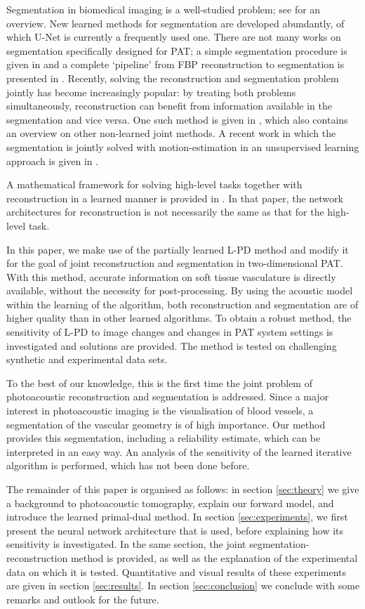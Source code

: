 \documentclass[journal]{IEEEtran}
\newcommand{\hl}[1]{\cbcolor{red}\begin{changebar}{\color{red} #1}\end{changebar}}
\begin{document}
Segmentation in biomedical imaging is a well-studied problem; see \cite{Acton2009} for an overview. New learned methods for segmentation are developed abundantly, of which U-Net \cite{Ronneberger2015} is currently a frequently used one. There are not many works on segmentation specifically designed for PAT; a simple segmentation procedure is given in \cite{Soetikno2012} and a complete `pipeline' from FBP reconstruction to segmentation is presented in \cite{Raumonen2018}. Recently, solving the reconstruction and segmentation problem jointly has become increasingly popular: by treating both problems simultaneously, reconstruction can benefit from information available in the segmentation and vice versa. One such method is given in \cite{Corona2018}, which also contains an overview on other non-learned joint methods. A recent work in which the segmentation is jointly solved with motion-estimation in an unsupervised learning approach is given in \cite{Qin2018}. \hl{A mathematical framework for solving high-level tasks together with reconstruction in a learned manner is provided in \cite{Adler2018b}. In that paper, the network architectures for reconstruction is not necessarily the same as that for the high-level task. }

In this paper, we make use of the partially learned L-PD method and modify it for the goal of joint reconstruction and segmentation in {two-dimensional} PAT. With this method, accurate information on soft tissue vasculature is directly available, without the necessity for post-processing. By using the acoustic model within the learning of the algorithm, both reconstruction and segmentation are of higher quality than in other learned algorithms. To obtain a robust method, the sensitivity of L-PD to image changes and changes in PAT system settings is investigated and solutions are provided. The method is tested on challenging synthetic and experimental data sets. 

To the best of our knowledge, this is the first time the joint problem of photoacoustic reconstruction and segmentation is addressed. Since a major interest in photoacoustic imaging is the visualisation of blood vessels, a segmentation of the vascular geometry is of high importance. Our method provides this segmentation, including a reliability estimate, which can be interpreted in an easy way. An analysis of the sensitivity of the learned iterative algorithm is performed, which has not been done before.

The remainder of this paper is organised as follows: in section \ref{sec:theory} we give a background to photoacoustic tomography, explain our forward model, and introduce the learned primal-dual method. In section \ref{sec:experiments}, we first present the neural network architecture that is used, before explaining how its sensitivity is investigated. In the same section, the joint segmentation-reconstruction method is provided, as well as the explanation of the experimental data on which it is tested. Quantitative and visual results of these experiments are given in section \ref{sec:results}. In section \ref{sec:conclusion} we conclude with some remarks and outlook for the future.
\end{document}
